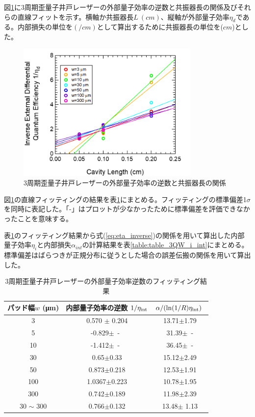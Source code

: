{図\ref{fig:fig_3_1_3QW_broadcontact_id_inverse_02}に3周期歪量子井戸レーザーの外部量子効率の逆数と共振器長の関係及びそれらの直線フィットを示す。横軸か共振器長$L\ (\si{cm})$、縦軸が外部量子効率$\eta_{d}$である。内部損失の単位を$\si{(/cm)}$として算出するために共振器長の単位を($\si{cm}$)とした。

\begin{figure}[h]
	\centering
	\includegraphics[width=9cm]{figure/fig_3_1_3QW_broadcontact_id_inverse_02.png}
	\caption{3周期歪量子井戸レーザーの外部量子効率の逆数と共振器長の関係}
	\label{fig:fig_3_1_3QW_broadcontact_id_inverse_02}
\end{figure}
図\ref{fig:fig_3_1_3QW_broadcontact_id_inverse_02}の直線フィッティングの結果を表\ref{table:table_3QW_i_d_fit}にまとめる。フィッティングの標準偏差1$\sigma$を同時に表記した。「-」はプロットが少なかったために標準偏差を評価できなかったことを意味する。

表\ref{table:table_3QW_i_d_fit}のフィッティング結果から式(\ref{eq:eta_inverse})の関係を用いて算出した内部量子効率$\eta_{i}$と内部損失$\alpha_{int}$の計算結果を表\ref{table:table_3QW_i_int}にまとめる。標準偏差はばらつきが正規分布に従うとした場合の誤差伝搬の関係を用いて算出した。

\begin{table}[h]
  \caption{3周期歪量子井戸レーザーの外部量子効率逆数のフィッティング結果}
  \label{table:table_3QW_i_d_fit}
  \centering
  \begin{tabular}{ccc}
    \hline
    パッド幅$w$ (\si{\micro\metre})  &  内部量子効率の逆数 $1/\eta_{\rm{int}} $ & $\alpha/(\ln(1/R)\eta_{\rm{int}})\ $ \\
    \hline \hline
     3 & 0.570 $\pm$ 0.204  & 13.71$\pm$1.79 \\
    5  & -0.829$\pm$\ -\ & 31.39$\pm$\ -\\
    10  & -1.412$\pm$\ -\  & 36.45$\pm$\ -\\ 
    30& 0.65$\pm$0.33& 15.12$\pm$2.49\\
    50& 0.873$\pm$0.218&12.53$\pm$1.91 \\
    100& 1.0367$\pm$0.223& 10.78$\pm$1.95\\
    300&0.742$\pm$0.189 & 11.98$\pm$2.39\\
    \hline
    30 $\sim$ 300 & 0.766$\pm$0.132 & 13.48$\pm$ 1.13\\
    \hline


\end{tabular}
\end{table}}
